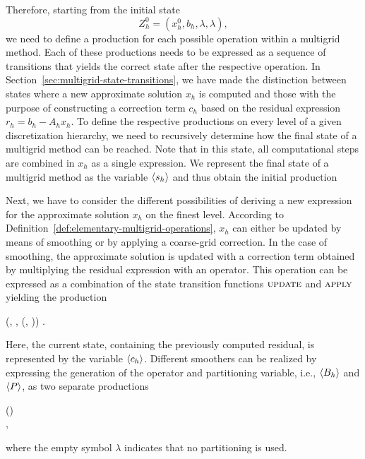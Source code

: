 Therefore, starting from the initial state 
\begin{equation}
	Z^0_h = (x_h^0, b_h, \lambda, \lambda),
 \label{eq:initial-mg-state}
\end{equation}
we need to define a production for each possible operation within a multigrid method.
Each of these productions needs to be expressed as a sequence of transitions that yields the correct state after the respective operation.
In Section~\ref{sec:multigrid-state-transitions}, we have made the distinction between states where a new approximate solution $x_h$ is computed and those with the purpose of constructing a correction term $c_h$ based on the residual expression $r_h = b_h - A_h x_h$.
To define the respective productions on every level of a given discretization hierarchy, we need to recursively determine how the final state of a multigrid method can be reached.
Note that in this state, all computational steps are combined in $x_h$ as a single expression.
We represent the final state of a multigrid method as the variable $\langle s_h \rangle$ and thus obtain the initial production 
\begin{production}
	 {
	}
\end{production}Next, we have to consider the different possibilities of deriving a new expression for the approximate solution $x_{h}$ on the finest level.
According to Definition~\ref{def:elementary-multigrid-operations}, $x_{h}$ can either be updated by means of smoothing or by applying a coarse-grid correction.
In the case of smoothing, the approximate solution is updated with a correction term obtained by multiplying the residual expression with an operator.
This operation can be expressed as a combination of the state transition functions $\textsc{update}$ and $\textsc{apply}$ yielding the production
\begin{production}
	 {
		(\bnfts{$\omega$}, \bnfsp {}, \bnfsp {}(, \bnfsp {}))
	}.
\label{prod:smoothing}
\end{production}Here, the current state, containing the previously computed residual, is represented by the variable $\langle c_h \rangle$.
Different smoothers can be realized by expressing the generation of the operator and partitioning variable, i.e., $\langle B_h \rangle$ and $\langle P \rangle$, as two separate productions
\begin{production}
	 {
		() \bnfsp {} \bnfsp {}
	}\label{prod:smoothing-operator} \\
 	 {
		 \bnfor \bnfes
	},\label{prod:partitioning}
\end{production}where the empty symbol $\lambda$ indicates that no partitioning is used. 
